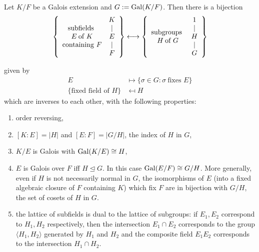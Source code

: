 \documentclass[a4paper]{article}
\begin{document}
\begin{theorem}
  Let $K/F$ be a Galois extension and $G := \operatorname{Gal}(K/F)$. Then there is a bijection
  \[
    \left\{
      \begin{array}[h]{c}
        \text{subfields } \\
        E\: \text{of } K \\
        \text{containing } F
      \end{array}
      \begin{array}[h]{c}
        K \\
        | \\
        E \\
        | \\
        F
      \end{array}
    \right\}
    \longleftrightarrow
    \left\{
      \begin{array}[h]{c}
        \text{subgroups } \\
        H \: \text{of } G
      \end{array}
      \begin{array}[h]{c}
        1 \\
        | \\
        H \\
        | \\
        G
      \end{array}
      \right\}
  \]

  given by
  \begin{align*}
    E & \mapsto \{\sigma \in G: \sigma \: \text{fixes } E\} \\
    \{\text{fixed field of } H\} & \mapsfrom H
  \end{align*}
  which are inverses to each other, with the following properties:
  \begin{enumerate}
  \item order reversing,
  \item $[K:E] = |H|$ and $[E:F] = |G/H|$, the index of $H$ in $G$,
  \item $K/E$ is Galois with $\operatorname{Gal}(K/E) \cong H$,
  \item $E$ is Galois over $F$ iff $H \trianglelefteq G$. In this case $\operatorname{Gal}(E/F) \cong G/H$. More generally, even if $H$ is not necessarily normal in $G$, the isomorphisms of $E$ (into a fixed algebraic closure of $F$ containing $K$) which fix $F$ are in bijection with $G/H$, the set of cosets of $H$ in $G$.
  \item the lattice of subfields is dual to the lattice of subgroups: if $E_1, E_2$ correspond to $H_1, H_2$ respectively, then the intersection $E_1 \cap E_2$ corresponds to the group $\langle H_1, H_2 \rangle$ generated by $H_1$ and $H_2$ and the composite field $E_1E_2$ corresponds to the intersection $H_1 \cap H_2$.
  \end{enumerate}
\end{theorem}
\end{document}
